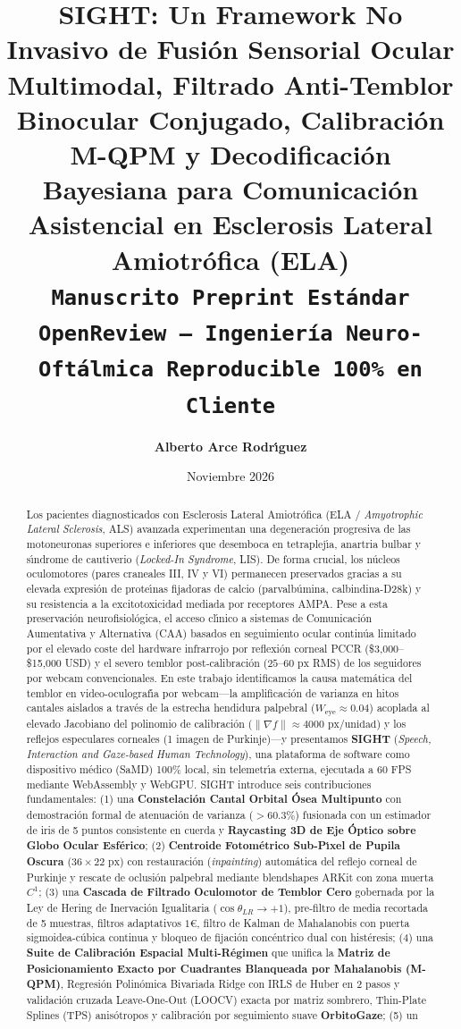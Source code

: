 \documentclass[twocolumn,10pt]{article}
\title{\textbf{SIGHT: Un Framework No Invasivo de Fusi\'on Sensorial Ocular Multimodal, Filtrado Anti-Temblor Binocular Conjugado, Calibraci\'on M-QPM y Decodificaci\'on Bayesiana para Comunicaci\'on Asistencial en Esclerosis Lateral Amiotr\'ofica (ELA)}\\[0.4em]
\large \texttt{Manuscrito Preprint Est\'andar OpenReview --- Ingenier\'{\i}a Neuro-Oft\'almica Reproducible 100\% en Cliente}}
\author[1]{\textbf{Alberto Arce Rodr\'{\i}guez}}
\affil[1]{Laboratorio de Tecnolog\'{\i}a Asistencial, Neurocomputaci\'on y Ciencias de la Visi\'on}
\affil[ ]{\textit{Correspondencia: alberto.arce.ti@gmail.com \quad|\quad Repositorio Abierto y Artefacto Web: \url{https://alarti.github.io/sight/}}}
\date{Noviembre 2026}
\begin{document}
\maketitle

\begin{abstract}
Los pacientes diagnosticados con Esclerosis Lateral Amiotr\'ofica (ELA / \textit{Amyotrophic Lateral Sclerosis}, ALS) avanzada experimentan una degeneraci\'on progresiva de las motoneuronas superiores e inferiores que desemboca en tetraplej\'{\i}a, anartria bulbar y s\'{\i}ndrome de cautiverio (\textit{Locked-In Syndrome}, LIS). De forma crucial, los n\'ucleos oculomotores (pares craneales III, IV y VI) permanecen preservados gracias a su elevada expresi\'on de prote\'{\i}nas fijadoras de calcio (parvalb\'umina, calbindina-D28k) y su resistencia a la excitotoxicidad mediada por receptores AMPA. Pese a esta preservaci\'on neurofisiol\'ogica, el acceso cl\'{\i}nico a sistemas de Comunicaci\'on Aumentativa y Alternativa (CAA) basados en seguimiento ocular contin\'ua limitado por el elevado coste del hardware infrarrojo por reflexi\'on corneal PCCR (\$3,000--\$15,000 USD) y el severo temblor post-calibraci\'on ($25\text{--}60\text{ px}$ RMS) de los seguidores por webcam convencionales. En este trabajo identificamos la causa matem\'atica del temblor en video-oculograf\'{\i}a por webcam---la amplificaci\'on de varianza en hitos cantales aislados a trav\'es de la estrecha hendidura palpebral ($W_{\text{eye}} \approx 0.04$) acoplada al elevado Jacobiano del polinomio de calibraci\'on ($\|\nabla f\| \approx 4000\text{ px/unidad}$) y los reflejos especulares corneales (1\textordfeminine{} imagen de Purkinje)---y presentamos \textbf{SIGHT} (\textit{Speech, Interaction and Gaze-based Human Technology}), una plataforma de software como dispositivo m\'edico (SaMD) 100\% local, sin telemetr\'{\i}a externa, ejecutada a 60 FPS mediante WebAssembly y WebGPU. SIGHT introduce seis contribuciones fundamentales: (1) una \textbf{Constelaci\'on Cantal Orbital \'Osea Multipunto} con demostraci\'on formal de atenuaci\'on de varianza ($>60.3\%$) fusionada con un estimador de iris de 5 puntos consistente en cuerda y \textbf{Raycasting 3D de Eje \'Optico sobre Globo Ocular Esf\'erico}; (2) \textbf{Centroide Fotom\'etrico Sub-P\'{\i}xel de Pupila Oscura} ($36 \times 22\text{ px}$) con restauraci\'on (\textit{inpainting}) autom\'atica del reflejo corneal de Purkinje y rescate de oclusi\'on palpebral mediante blendshapes ARKit con zona muerta $C^1$; (3) una \textbf{Cascada de Filtrado Oculomotor de Temblor Cero} gobernada por la Ley de Hering de Inervaci\'on Igualitaria ($\cos\theta_{LR} \to +1$), pre-filtro de media recortada de 5 muestras, filtros adaptativos $1\text{€}$, filtro de Kalman de Mahalanobis con puerta sigmoidea-c\'ubica continua y bloqueo de fijaci\'on conc\'entrico dual con hist\'eresis; (4) una \textbf{Suite de Calibraci\'on Espacial Multi-R\'egimen} que unifica la \textbf{Matriz de Posicionamiento Exacto por Cuadrantes Blanqueada por Mahalanobis (M-QPM)}, Regresi\'on Polin\'omica Bivariada Ridge con IRLS de Huber en 2 pasos y validaci\'on cruzada Leave-One-Out (LOOCV) exacta por matriz sombrero, Thin-Plate Splines (TPS) anis\'otropos y calibraci\'on por seguimiento suave \textbf{OrbitoGaze}; (5) un 
\end{abstract}
\end{document}
